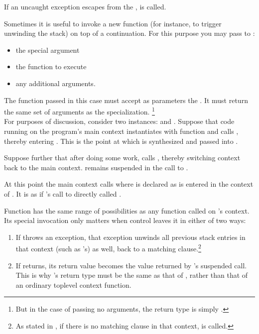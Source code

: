 \label{subsec:exceptions}
If an uncaught exception escapes from the \entryfn,  is called.


Sometimes it is useful to invoke a new function (for instance, to trigger
unwinding the stack) on top of a continuation. For this purpose you may
pass to :

\begin{itemize}
  \item the special argument 
  \item the function to execute
  \item any additional arguments.
\end{itemize}

The function passed in this case must accept as parameters the \cont.
It must return the same set of arguments as the \resume specialization.
\footnote{But in the case of passing no arguments, the return type is simply
.}\\

For purposes of discussion, consider two \cont instances:  and .
Suppose that code running on the program's main context instantiates 
with function  and calls , thereby entering .
This is the point at which  is synthesized and passed into .

Suppose further that after doing some work,  calls ,
thereby switching context back to the main context.  remains
suspended in the call to .

At this point the main context calls 
where  is declared as   is
entered in the context of . It is as if 's call to
 directly called .

Function  has the same range of possibilities as any function called
on 's context. Its special invocation only matters when control
leaves it in either of two ways:

\begin{enumerate}
  \item If  throws an exception, that exception unwinds all previous
        stack entries in that context (such as 's) as well, back to a
        matching  clause.\footnote{As stated in
        , if there is no matching  clause
        in that context,  is called.}
  \item If  returns, its return value becomes the value returned by
        's suspended  call. This is why 's
        return type must be the same as that of \resume, rather than that of an
        ordinary toplevel context function.
\end{enumerate}

